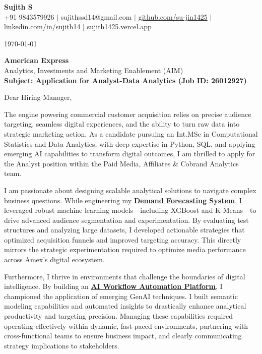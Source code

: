 \documentclass[a4paper,11pt]{article}
\newcommand{\ulink}[2]{\href{#1}{#2}}
\begin{document}
\pagestyle{empty}

\begin{center}
{\color[HTML]{000000}\fontsize{30}{35}\selectfont\bfseries Sujith S} \\[5pt]
{\fontsize{10.5}{12.5}\selectfont\textcolor[HTML]{3A3A3A}{+91 9843579926 $|$ sujithssd14@gmail.com $|$ \ulink{https://github.com/su-jin1425}{github.com/su-jin1425} $|$ \ulink{https://linkedin.com/in/sujith14}{linkedin.com/in/sujith14} $|$ \ulink{https://sujith1425.vercel.app}{sujith1425.vercel.app}}}
\end{center}

\vspace{10pt}

\today

\textbf{American Express} \\
Analytics, Investments and Marketing Enablement (AIM) \\

\textbf{Subject: Application for Analyst-Data Analytics (Job ID: 26012927)}

Dear Hiring Manager,

The engine powering commercial customer acquisition relies on precise audience targeting, seamless digital experiences, and the ability to turn raw data into strategic marketing action. As a candidate pursuing an Int.MSc in Computational Statistics and Data Analytics, with deep expertise in Python, SQL, and applying emerging AI capabilities to transform digital outcomes, I am thrilled to apply for the Analyst position within the Paid Media, Affiliates \& Cobrand Analytics team.

I am passionate about designing scalable analytical solutions to navigate complex business questions. While engineering my \ulink{https://github.com/su-jin1425/Demand-Forecasting-System}{\textbf{Demand Forecasting System}}, I leveraged robust machine learning models---including XGBoost and K-Means---to drive advanced audience segmentation and experimentation. By evaluating test structures and analyzing large datasets, I developed actionable strategies that optimized acquisition funnels and improved targeting accuracy. This directly mirrors the strategic experimentation required to optimize media performance across Amex's digital ecosystem.

Furthermore, I thrive in environments that challenge the boundaries of digital intelligence. By building an \ulink{https://github.com/su-jin1425/AI-Workflow-Automation-Platform}{\textbf{AI Workflow Automation Platform}}, I championed the application of emerging GenAI techniques. I built semantic modeling capabilities and automated insights to drastically enhance analytical productivity and targeting precision. Managing these capabilities required operating effectively within dynamic, fast-paced environments, partnering with cross-functional teams to ensure business impact, and clearly communicating strategy implications to stakeholders.
\end{document}
